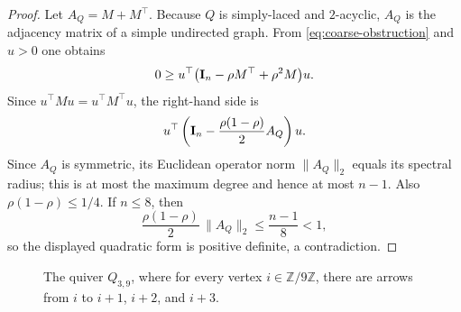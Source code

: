 \documentclass[11pt,letterpaper,reqno]{amsart}
\theoremstyle{definition}
\begin{document}
\begin{proof}
	Let $A_Q=M+M^{\top}$.  Because $Q$ is simply-laced and $2$-acyclic,
	$A_Q$ is the adjacency matrix of a simple undirected graph.  From
	\eqref{eq:coarse-obstruction} and $u>0$ one obtains
	\[
	0\geq
	u^{\top}
	\bigl({\bf I}_{n}-\rho M^{\top}+\rho^2M\bigr)u.
	\]
	Since $u^{\top}Mu=u^{\top}M^{\top}u$, the right-hand side is
	\[
	u^{\top}
	\left(
	{\bf I}_{n}-\frac{\rho(1-\rho)}2A_Q
	\right)u.
	\]
	Since $A_Q$ is symmetric, its Euclidean operator norm
	$\lVert A_Q\rVert_2$ equals its spectral radius; this is at most the
	maximum degree and hence at most $n-1$.  Also
	$\rho(1-\rho)\leq1/4$.  If $n\leq8$, then
	\[
	\frac{\rho(1-\rho)}2\,\lVert A_Q\rVert_2
	\leq\frac{n-1}{8}<1,
	\]
	so the displayed quadratic form is positive definite, a contradiction.
\end{proof}


\begin{figure}[htbp]
	\centering
	\caption{The quiver $Q_{3,9}$, where for every vertex $i\in\mathbb Z/9\mathbb Z$,
		there are arrows from $i$ to $i+1$, $i+2$, and $i+3$.}
	\label{fig:q-nine}
\end{figure}
\end{document}
